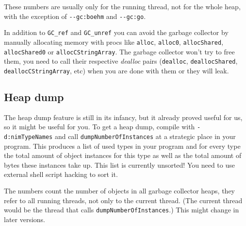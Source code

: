 These numbers are usually only for the running thread, not for the whole
heap, with the exception of \texttt{-\/-gc:boehm} and
\texttt{-\/-gc:go}.

In addition to \texttt{GC\_ref} and \texttt{GC\_unref} you can avoid the
garbage collector by manually allocating memory with procs like
\texttt{alloc}, \texttt{alloc0}, \texttt{allocShared},
\texttt{allocShared0} or \texttt{allocCStringArray}. The garbage
collector won't try to free them, you need to call their respective
\emph{dealloc} pairs (\texttt{dealloc}, \texttt{deallocShared},
\texttt{deallocCStringArray}, etc) when you are done with them or they
will leak.

\hypertarget{heap-dump}{%
\subsection{Heap dump}\label{heap-dump}}

The heap dump feature is still in its infancy, but it already proved
useful for us, so it might be useful for you. To get a heap dump,
compile with \texttt{-d:nimTypeNames} and call
\texttt{dumpNumberOfInstances} at a strategic place in your program.
This produces a list of used types in your program and for every type
the total amount of object instances for this type as well as the total
amount of bytes these instances take up. This list is currently
unsorted! You need to use external shell script hacking to sort it.

The numbers count the number of objects in all garbage collector heaps,
they refer to all running threads, not only to the current thread. (The
current thread would be the thread that calls
\texttt{dumpNumberOfInstances}.) This might change in later versions.
